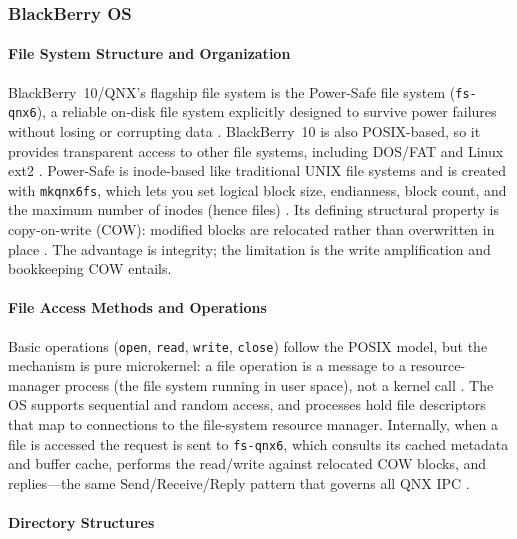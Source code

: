 \subsubsection{BlackBerry OS}

\paragraph{File System Structure and Organization}

BlackBerry~10/QNX's flagship file system is the Power-Safe file system
(\texttt{fs-qnx6}), a reliable on-disk file system explicitly designed
to survive power failures without losing or corrupting data
\citep{qnx_powersafe_fs}. BlackBerry~10 is also POSIX-based, so it provides transparent access to
other file systems, including DOS/FAT and Linux ext2
\citep{qnx_neutrino_overview, qnx_fs_fault_tolerance}. Power-Safe is inode-based like traditional UNIX file
systems and is created with \texttt{mkqnx6fs}, which lets you set
logical block size, endianness, block count, and the maximum number of
inodes (hence files) \citep{qnx_powersafe_fs}. Its defining structural
property is copy-on-write (COW): modified blocks are relocated rather
than overwritten in place \citep{qnx_fs_fault_tolerance}. The advantage
is integrity; the limitation is the write amplification and bookkeeping
COW entails.

\paragraph{File Access Methods and Operations}

Basic operations (\texttt{open}, \texttt{read}, \texttt{write},
\texttt{close}) follow the POSIX model, but the mechanism is pure
microkernel: a file operation is a message to a resource-manager
process (the file system running in user space), not a kernel call
\citep{qnx_memman, qnx_powersafe_fs}. The OS supports sequential and
random access, and processes hold file descriptors that map to
connections to the file-system resource manager. Internally, when a
file is accessed the request is sent to \texttt{fs-qnx6}, which
consults its cached metadata and buffer cache, performs the read/write
against relocated COW blocks, and replies---the same Send/Receive/Reply
pattern that governs all QNX IPC \citep{qnx_ipc, qnx_powersafe_fs}.

\paragraph{Directory Structures}

